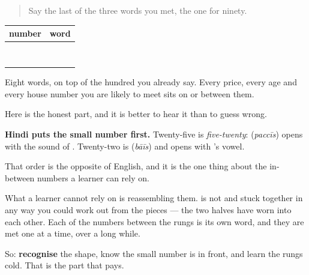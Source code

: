 \label{lesson:HI-C96-repaso-ginti}



\begin{quote}
Say the last of the three words you met, the one for ninety.
\end{quote}

\begin{grammarlens}[title={Grammar Lens: the ladder}]
\noindent
\begin{tabularx}{\linewidth}{@{}>{\raggedright\arraybackslash}X>{\raggedright\arraybackslash}X@{}}
\toprule
\textbf{number} & \textbf{word} \\
\midrule
20 & \hi{बीस} \\
30 & \hi{तीस} \\
40 & \hi{चालीस} \\
50 & \hi{पचास} \\
60 & \hi{साठ} \\
70 & \hi{सत्तर} \\
80 & \hi{अस्सी} \\
90 & \hi{नब्बे} \\
\bottomrule
\end{tabularx}

Eight words, on top of the hundred you already say. Every price, every age and every house number you are likely to meet sits on or between them.
\end{grammarlens}

\begin{grammarlens}[title={Grammar Lens: what sits between them}]
Here is the honest part, and it is better to hear it than to guess wrong.

\textbf{Hindi puts the small number first.} Twenty-five is \emph{five-twenty}: \textbf{} (\emph{paccīs}) opens with the sound of \textbf{}. Twenty-two is \textbf{} (\emph{bāīs}) and opens with \textbf{}'s vowel.

That order is the opposite of English, and it is the one thing about the in-between numbers a learner can rely on.

What a learner cannot rely on is reassembling them. \textbf{} is not \textbf{} and \textbf{} stuck together in any way you could work out from the pieces — the two halves have worn into each other. Each of the numbers between the rungs is its own word, and they are met one at a time, over a long while.

So: \textbf{recognise} the shape, know the small number is in front, and learn the rungs cold. That is the part that pays.
\end{grammarlens}

